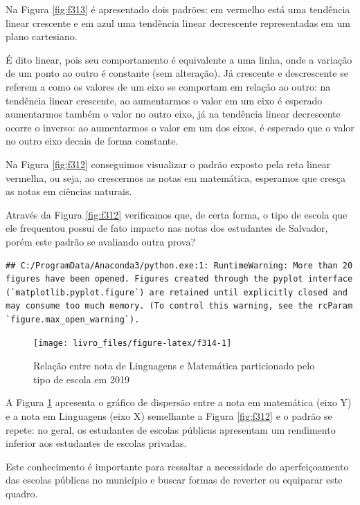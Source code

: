 \documentclass[
  oneside]{book}
\begin{document}
Na Figura \ref{fig:f313} é apresentado dois padrões: em vermelho está uma tendência linear crescente e em azul uma tendência linear decrescente representadas em um plano cartesiano.

É dito linear, pois seu comportamento é equivalente a uma linha, onde a variação de um ponto ao outro é constante (sem alteração). Já crescente e descrescente se referem a como os valores de um eixo se comportam em relação ao outro: na tendência linear crescente, ao aumentarmos o valor em um eixo é esperado aumentarmos também o valor no outro eixo, já na tendência linear decrescente ocorre o inverso: ao aumentarmos o valor em um dos eixos, é esperado que o valor no outro eixo decaia de forma constante.

Na Figura \ref{fig:f312} conseguimos visualizar o padrão exposto pela reta linear vermelha, ou seja, ao crescermos as notas em matemática, esperamos que cresça as notas em ciências naturais.

Através da Figura \ref{fig:f312} verificamos que, de certa forma, o tipo de escola que ele frequentou possui de fato impacto nas notas dos estudantes de Salvador, porém este padrão se avaliando outra prova?

\begin{verbatim}
## C:/ProgramData/Anaconda3/python.exe:1: RuntimeWarning: More than 20 figures have been opened. Figures created through the pyplot interface (`matplotlib.pyplot.figure`) are retained until explicitly closed and may consume too much memory. (To control this warning, see the rcParam `figure.max_open_warning`).
\end{verbatim}

\begin{figure}

{\centering \texttt{[image: livro\_files/figure-latex/f314-1]} 

}

\caption{Relação entre nota de Linguagens e Matemática particionado pelo tipo de escola em 2019}\label{fig:f314}
\end{figure}

A Figura \ref{fig:f314} apresenta o gráfico de dispersão entre a nota em matemática (eixo Y) e a nota em Linguagens (eixo X) semelhante a Figura \ref{fig:f312} e o padrão se repete: no geral, os estudantes de escolas públicas apresentam um rendimento inferior aos estudantes de escolas privadas.

Este conhecimento é importante para ressaltar a necessidade do aperfeiçoamento das escolas públicas no município e buscar formas de reverter ou equiparar este quadro.
\end{document}
